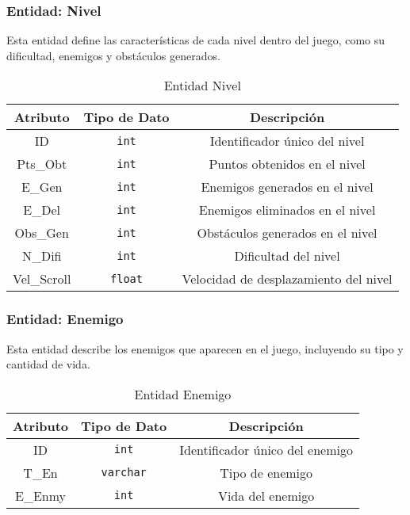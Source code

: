 \subsubsection{Entidad: Nivel}
Esta entidad define las características de cada nivel dentro del juego, como su dificultad, enemigos y obstáculos generados.
\begin{table}[H]
\centering
\begin{tabular}{|c|c|c|}
\hline
\textbf{Atributo} & \textbf{Tipo de Dato} & \textbf{Descripción} \\ \hline
ID & \texttt{int} & Identificador único del nivel \\ \hline
Pts\_Obt & \texttt{int} & Puntos obtenidos en el nivel \\ \hline
E\_Gen & \texttt{int} & Enemigos generados en el nivel \\ \hline
E\_Del & \texttt{int} & Enemigos eliminados en el nivel \\ \hline
Obs\_Gen & \texttt{int} & Obstáculos generados en el nivel \\ \hline
N\_Difi & \texttt{int} & Dificultad del nivel \\ \hline
Vel\_Scroll & \texttt{float} & Velocidad de desplazamiento del nivel \\ \hline
\end{tabular}
\caption{Entidad Nivel}
\end{table}

\subsubsection{Entidad: Enemigo}
Esta entidad describe los enemigos que aparecen en el juego, incluyendo su tipo y cantidad de vida.
\begin{table}[H]
\centering
\begin{tabular}{|c|c|c|}
\hline
\textbf{Atributo} & \textbf{Tipo de Dato} & \textbf{Descripción} \\ \hline
ID & \texttt{int} & Identificador único del enemigo \\ \hline
T\_En & \texttt{varchar} & Tipo de enemigo \\ \hline
E\_Enmy & \texttt{int} & Vida del enemigo \\ \hline
\end{tabular}
\caption{Entidad Enemigo}
\end{table}

